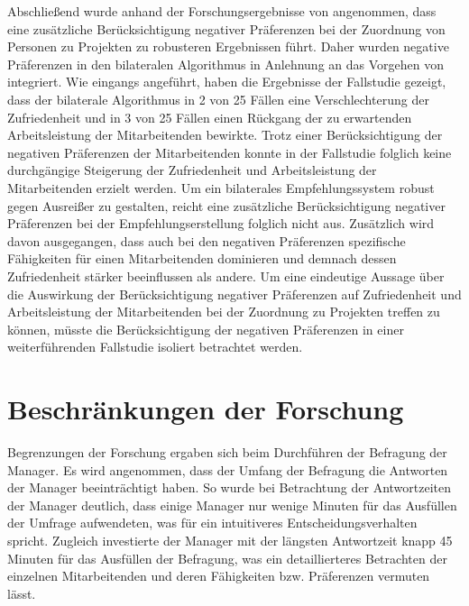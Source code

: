 Abschließend wurde anhand der Forschungsergebnisse von \textcite[S. 1ff.]{link:booklet} angenommen, dass eine zusätzliche Berücksichtigung negativer Präferenzen bei der Zuordnung von Personen zu Projekten zu robusteren Ergebnissen führt.
Daher wurden negative Präferenzen in den bilateralen Algorithmus in Anlehnung an das Vorgehen von \textcite[S. 269ff.]{pizzato:2:inproceedings} integriert.
Wie eingangs angeführt, haben die Ergebnisse der Fallstudie gezeigt, dass der bilaterale Algorithmus in 2 von 25 Fällen eine Verschlechterung der Zufriedenheit und in 3 von 25 Fällen einen Rückgang der zu erwartenden Arbeitsleistung der Mitarbeitenden bewirkte.
Trotz einer Berücksichtigung der negativen Präferenzen der Mitarbeitenden konnte in der Fallstudie folglich keine durchgängige Steigerung der Zufriedenheit und Arbeitsleistung der Mitarbeitenden erzielt werden. 
Um ein bilaterales Empfehlungssystem robust gegen Ausreißer zu gestalten, reicht eine zusätzliche Berücksichtigung negativer Präferenzen bei der Empfehlungserstellung folglich nicht aus.
Zusätzlich wird davon ausgegangen, dass auch bei den negativen Präferenzen spezifische Fähigkeiten für einen Mitarbeitenden dominieren und demnach dessen Zufriedenheit stärker beeinflussen als andere.
Um eine eindeutige Aussage über die Auswirkung der Berücksichtigung negativer Präferenzen auf Zufriedenheit und Arbeitsleistung der Mitarbeitenden bei der Zuordnung zu Projekten treffen zu können, müsste die Berücksichtigung der negativen Präferenzen in einer weiterführenden Fallstudie isoliert betrachtet werden.


\section{Beschränkungen der Forschung}
Begrenzungen der Forschung ergaben sich beim Durchführen der Befragung der Manager.
Es wird angenommen, dass der Umfang der Befragung die Antworten der Manager beeinträchtigt haben.
So wurde bei Betrachtung der Antwortzeiten der Manager deutlich, dass einige Manager nur wenige Minuten für das Ausfüllen der Umfrage aufwendeten, was für ein intuitiveres Entscheidungsverhalten spricht.
Zugleich investierte der Manager mit der längsten Antwortzeit knapp 45 Minuten für das Ausfüllen der Befragung, was ein detaillierteres Betrachten der einzelnen Mitarbeitenden und deren Fähigkeiten bzw. Präferenzen vermuten lässt.

